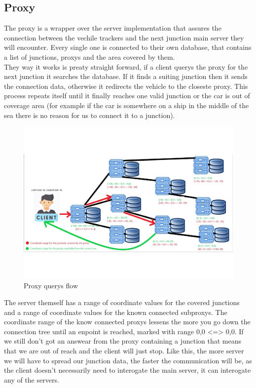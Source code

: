 \documentclass[17pt]{article}
\begin{document}
\subsection{Proxy}
\indent \indent
The proxy is a wrapper over the server implementation that assures the connection
between the vechile trackers and the next junction main server they will encounter.
Every single one is connected to their own database, that contains a list of junctions,
proxys and the area covered by them. \\
\indent \indent
They way it works is preaty straight forward, if a client 
querys the proxy for the next junction it searches the database. If it finds 
a suiting junction then it sends the connection data, otherwise it redirects 
the vehicle to the closeste proxy. This process repeats itself until it 
finally reaches one valid junction or the car is out of coverage area (for 
example if the car is somewhere on a ship in the middle of the sea there is 
no reason for us to connect it to a junction).

\begin{figure}[h!]
    \includegraphics[width=\textwidth]{Sketches/ProxyFlowV2.png}
    \caption{Proxy querys flow}
    \label{fig:Proxy querys flow}
\end{figure}

The server themself has a range of coordinate values for the covered junctions
and a range of coordinate values for the known connected subproxys. The coordinate 
range of the know connected proxys lessens the more you go down the connection tree 
until an enpoint is reached, marked with range {0,0} <=> {0,0}. If we still don't got 
an answear from the proxy containing a junction that means that we are out of reach 
and the client will just stop. Like this, the more server we will have to spread our 
junction data, the faster the communication will be, as the client doesn't necessarily
need to interogate the main server, it can interogate any of the servers.
\pagebreak
\end{document}
